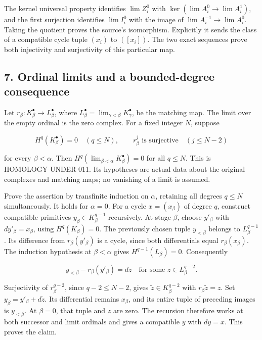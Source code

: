 \documentclass[11pt]{article}
\begin{document}
The kernel universal property identifies \(\lim Z_i^0\) with \(\ker(\lim A_i^0\to\lim A_i^1)\), and the first surjection identifies \(\lim I_i^0\) with the image of \(\lim A_i^{-1}\to\lim A_i^0\). Taking the quotient proves the source's isomorphism. Explicitly it sends the class of a compatible cycle tuple \((x_i)\) to \(([x_i])\). The two exact sequences prove both injectivity and surjectivity of this particular map.

\subsection{7. Ordinal limits and a bounded-degree consequence}\label{note-09-ordinal-limits-and-a-bounded-degree-consequence}

Let \(r_\beta:K_\beta^\bullet\to L_\beta^\bullet\), where \(L_\beta^\bullet=\lim_{\gamma<\beta}K_\gamma^\bullet\), be the matching map. The limit over the empty ordinal is the zero complex. For a fixed integer \(N\), suppose

\[
H^q(K_\beta^\bullet)=0\quad(q\leq N),\qquad
r_\beta^j\text{ is surjective}\quad(j\leq N-2)
\]

for every \(\beta<\alpha\). Then \(H^q(\lim_{\beta<\alpha}K_\beta^\bullet)=0\) for all \(q\leq N\). This is HOMOLOGY-UNDER-011. Its hypotheses are actual data about the original complexes and matching maps; no vanishing of a limit is assumed.

Prove the assertion by transfinite induction on \(\alpha\), retaining all degrees \(q\leq N\) simultaneously. It holds for \(\alpha=0\). For a cycle \(x=(x_\beta)\) of degree \(q\), construct compatible primitives \(y_\beta\in K_\beta^{q-1}\) recursively. At stage \(\beta\), choose \(y'_\beta\) with \(dy'_\beta=x_\beta\), using \(H^q(K_\beta)=0\). The previously chosen tuple \(y_{<\beta}\) belongs to \(L_\beta^{q-1}\). Its difference from \(r_\beta(y'_\beta)\) is a cycle, since both differentials equal \(r_\beta(x_\beta)\). The induction hypothesis at \(\beta<\alpha\) gives \(H^{q-1}(L_\beta)=0\). Consequently

\[
y_{<\beta}-r_\beta(y'_\beta)=dz
\quad\text{for some }z\in L_\beta^{q-2}.
\]

Surjectivity of \(r_\beta^{q-2}\), since \(q-2\leq N-2\), gives \(\widetilde z\in K_\beta^{q-2}\) with \(r_\beta\widetilde z=z\). Set \(y_\beta=y'_\beta+d\widetilde z\). Its differential remains \(x_\beta\), and its entire tuple of preceding images is \(y_{<\beta}\). At \(\beta=0\), that tuple and \(z\) are zero. The recursion therefore works at both successor and limit ordinals and gives a compatible \(y\) with \(dy=x\). This proves the claim.
\end{document}

